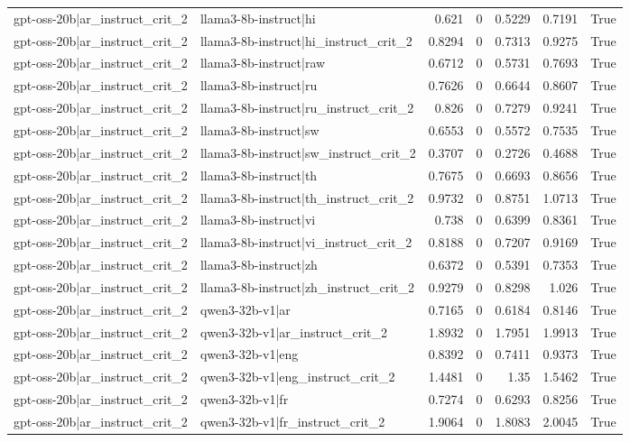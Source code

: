 \begin{table}
\begin{tabular}{l l r r r r l}
gpt-oss-20b|ar_instruct_crit_2 & llama3-8b-instruct|hi & 0.621 & 0 & 0.5229 & 0.7191 & True \\
gpt-oss-20b|ar_instruct_crit_2 & llama3-8b-instruct|hi_instruct_crit_2 & 0.8294 & 0 & 0.7313 & 0.9275 & True \\
gpt-oss-20b|ar_instruct_crit_2 & llama3-8b-instruct|raw & 0.6712 & 0 & 0.5731 & 0.7693 & True \\
gpt-oss-20b|ar_instruct_crit_2 & llama3-8b-instruct|ru & 0.7626 & 0 & 0.6644 & 0.8607 & True \\
gpt-oss-20b|ar_instruct_crit_2 & llama3-8b-instruct|ru_instruct_crit_2 & 0.826 & 0 & 0.7279 & 0.9241 & True \\
gpt-oss-20b|ar_instruct_crit_2 & llama3-8b-instruct|sw & 0.6553 & 0 & 0.5572 & 0.7535 & True \\
gpt-oss-20b|ar_instruct_crit_2 & llama3-8b-instruct|sw_instruct_crit_2 & 0.3707 & 0 & 0.2726 & 0.4688 & True \\
gpt-oss-20b|ar_instruct_crit_2 & llama3-8b-instruct|th & 0.7675 & 0 & 0.6693 & 0.8656 & True \\
gpt-oss-20b|ar_instruct_crit_2 & llama3-8b-instruct|th_instruct_crit_2 & 0.9732 & 0 & 0.8751 & 1.0713 & True \\
gpt-oss-20b|ar_instruct_crit_2 & llama3-8b-instruct|vi & 0.738 & 0 & 0.6399 & 0.8361 & True \\
gpt-oss-20b|ar_instruct_crit_2 & llama3-8b-instruct|vi_instruct_crit_2 & 0.8188 & 0 & 0.7207 & 0.9169 & True \\
gpt-oss-20b|ar_instruct_crit_2 & llama3-8b-instruct|zh & 0.6372 & 0 & 0.5391 & 0.7353 & True \\
gpt-oss-20b|ar_instruct_crit_2 & llama3-8b-instruct|zh_instruct_crit_2 & 0.9279 & 0 & 0.8298 & 1.026 & True \\
gpt-oss-20b|ar_instruct_crit_2 & qwen3-32b-v1|ar & 0.7165 & 0 & 0.6184 & 0.8146 & True \\
gpt-oss-20b|ar_instruct_crit_2 & qwen3-32b-v1|ar_instruct_crit_2 & 1.8932 & 0 & 1.7951 & 1.9913 & True \\
gpt-oss-20b|ar_instruct_crit_2 & qwen3-32b-v1|eng & 0.8392 & 0 & 0.7411 & 0.9373 & True \\
gpt-oss-20b|ar_instruct_crit_2 & qwen3-32b-v1|eng_instruct_crit_2 & 1.4481 & 0 & 1.35 & 1.5462 & True \\
gpt-oss-20b|ar_instruct_crit_2 & qwen3-32b-v1|fr & 0.7274 & 0 & 0.6293 & 0.8256 & True \\
gpt-oss-20b|ar_instruct_crit_2 & qwen3-32b-v1|fr_instruct_crit_2 & 1.9064 & 0 & 1.8083 & 2.0045 & True \\

\end{tabular}
\end{table}
